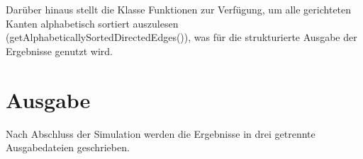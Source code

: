 \begin{figure}[h!]
    \centering
\end{figure}


Darüber hinaus stellt die Klasse Funktionen zur Verfügung,
um alle gerichteten Kanten alphabetisch sortiert auszulesen (getAlphabeticallySortedDirectedEdges()),
was für die strukturierte Ausgabe der Ergebnisse genutzt wird.

\cleardoublepage

\section{Ausgabe}

Nach Abschluss der Simulation werden die Ergebnisse in drei getrennte Ausgabedateien geschrieben.

